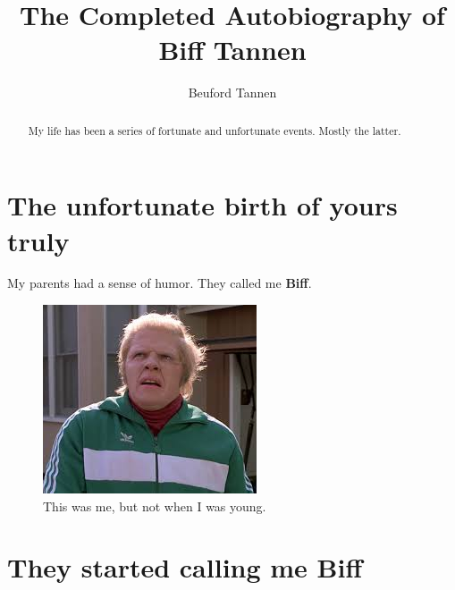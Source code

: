 \documentclass[a4paper,10pt]{article}
\title{The Completed Autobiography of Biff Tannen}
\author{Beuford Tannen}
\newcommand{\biff}[0]{\textbf{Biff}}
\begin{document}
  \maketitle

  \begin{abstract}
  My life has been a series of fortunate and unfortunate events. Mostly the latter. 

  \end{abstract}

  \section{The unfortunate birth of yours truly}
  \label{sec:into}
  
  My parents had a sense of humor.  They called me \biff.
  
    \begin{figure}[H]
  \centering
      \includegraphics[width=1.0\columnwidth]{biff.jpg}
      \caption{This was me, but not when I was young.}
      \label{fig:biff_the_man}
  \end{figure}
  
  
  \cite{yamauchi-nakano-funakoshi:2013:SIGDIAL}
  
  
  \section{They started calling me Biff}
\end{document}
